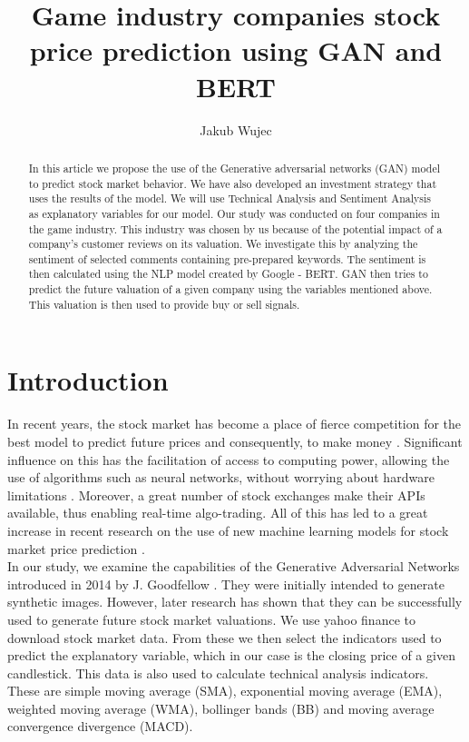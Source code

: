 \documentclass[11pt]{article} %
\title{Game industry companies stock price prediction using GAN and BERT}
\author{Jakub Wujec}
\begin{document}
\maketitle


\begin{abstract} In this article we propose the use of the Generative adversarial networks (GAN) model to predict stock market behavior. We have also developed an investment strategy that uses the results of the model. We will use Technical Analysis and Sentiment Analysis as explanatory variables for our model. Our study was conducted on four companies in the game industry. This industry was chosen by us because of the potential impact of a company's customer reviews on its valuation. We investigate this by analyzing the sentiment of selected comments containing pre-prepared keywords. The sentiment is then calculated using the NLP model created by Google - BERT. GAN then tries to predict the future valuation of a given company using the variables mentioned above. This valuation is then used to provide buy or sell signals.  
\end{abstract}

\section{Introduction}
In recent years, the stock market has become a place of fierce competition for the best model to predict future prices and consequently, to make money \cite{ml-in-stock}. 
Significant influence on this has the facilitation of access to computing power, allowing the use of algorithms such as neural networks, without worrying about hardware limitations \cite{ml-compute}. Moreover, a great number of stock exchanges make their APIs available, thus enabling real-time algo-trading. All of this has led to a great increase in recent research on the use of new machine learning models for stock market price prediction \cite{ml-studies}.  \\

In our study, we examine the capabilities of the Generative Adversarial Networks introduced in 2014 by J. Goodfellow \cite{gan1}. They were initially intended to generate synthetic images. However, later research has shown that they can be successfully used to generate future stock market valuations. We use yahoo finance to download stock market data. From these we then select the indicators used to predict the explanatory variable, which in our case is the closing price of a given candlestick. This data is also used to calculate technical analysis indicators. These are simple moving average (SMA), exponential moving average (EMA), weighted moving average (WMA), bollinger bands (BB) and moving average convergence divergence (MACD). \\
\end{document}
